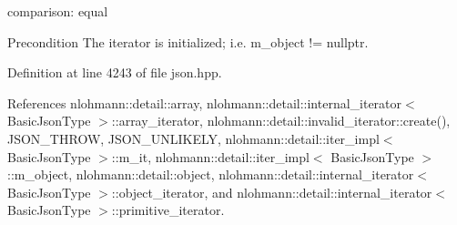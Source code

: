comparison\+: equal 

\begin{DoxyPrecond}{Precondition}
The iterator is initialized; i.\+e. {\ttfamily m\+\_\+object != nullptr}. 
\end{DoxyPrecond}


Definition at line 4243 of file json.\+hpp.



References nlohmann\+::detail\+::array, nlohmann\+::detail\+::internal\+\_\+iterator$<$ Basic\+Json\+Type $>$\+::array\+\_\+iterator, nlohmann\+::detail\+::invalid\+\_\+iterator\+::create(), J\+S\+O\+N\+\_\+\+T\+H\+R\+OW, J\+S\+O\+N\+\_\+\+U\+N\+L\+I\+K\+E\+LY, nlohmann\+::detail\+::iter\+\_\+impl$<$ Basic\+Json\+Type $>$\+::m\+\_\+it, nlohmann\+::detail\+::iter\+\_\+impl$<$ Basic\+Json\+Type $>$\+::m\+\_\+object, nlohmann\+::detail\+::object, nlohmann\+::detail\+::internal\+\_\+iterator$<$ Basic\+Json\+Type $>$\+::object\+\_\+iterator, and nlohmann\+::detail\+::internal\+\_\+iterator$<$ Basic\+Json\+Type $>$\+::primitive\+\_\+iterator.


